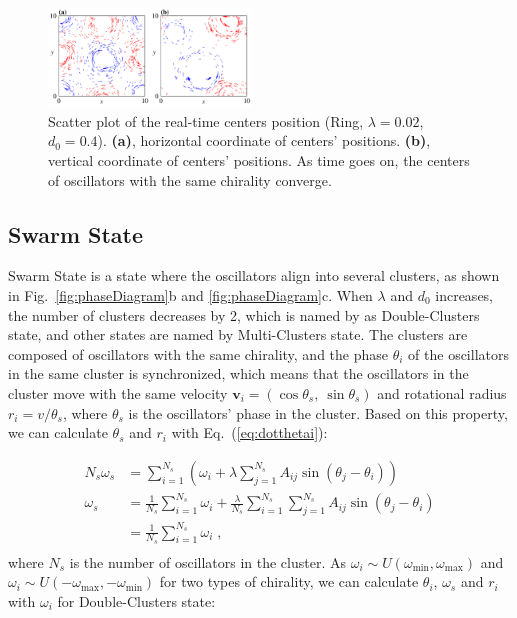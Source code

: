 \documentclass[%
 aip,
 amsmath,amssymb,
 reprint,%
]{revtex4-1}
\begin{document}
\begin{figure}
    \includegraphics[width=0.48\textwidth]{./figs/ringStateNum.pdf}
    \caption{
        \label{fig:ringStateNum} Scatter plot of the real-time centers position (Ring, $\lambda=0.02$, $d_0=0.4$). 
        \textbf{(a)}, horizontal coordinate of centers' positions.
        \textbf{(b)}, vertical coordinate of centers' positions. As time goes on, the centers of oscillators with the same chirality converge.
    }
\end{figure}

\subsection{Swarm State}

Swarm State is a state where the oscillators align into several clusters, as shown in Fig.~\ref{fig:phaseDiagram}b and \ref{fig:phaseDiagram}c. When $\lambda$ and $d_0$ increases, the number of clusters decreases by 2, which is named by as Double-Clusters state, and other states are named by Multi-Clusters state. The clusters are composed of oscillators with the same chirality, and the phase $\theta_i$ of the oscillators in the same cluster is synchronized, which means that the oscillators in the cluster move with the same velocity $\mathbf{v}_i=\left( \cos \theta _s,\ \sin \theta _s \right)$ and rotational radius $r_i=v/\theta_s$, where $\theta_s$ is the oscillators' phase in the cluster. Based on this property, we can calculate $\theta_s$ and $r_i$ with Eq.~(\ref{eq:dotthetai}):

\begin{equation}
    \begin{aligned}
        N_s\omega _s&=\sum_{i=1}^{N_s}{\left( \omega _i+\lambda \sum_{j=1}^{N_s}{A_{ij}\sin \left( \theta _j-\theta _i \right)} \right)}\\
        \omega _s&=\frac{1}{N_s}\sum_{i=1}^{N_s}{\omega _i}+\frac{\lambda}{N_s}\sum_{i=1}^{N_s}{\sum_{j=1}^{N_s}{A_{ij}\sin \left( \theta _j-\theta _i \right)}}\\
        &=\frac{1}{N_s}\sum_{i=1}^{N_s}{\omega _i}\;,\\
    \end{aligned}
\end{equation}
where $N_s$ is the number of oscillators in the cluster.
As $\omega_i \sim U\left( \omega _{\min},\omega _{\max} \right)$ and $\omega_i \sim U\left( -\omega _{\max},-\omega _{\min} \right)$ for two types of chirality, we can calculate $\theta_i$, $\omega_s$ and $r_i$ with $\omega_i$ for Double-Clusters state:
\end{document}

